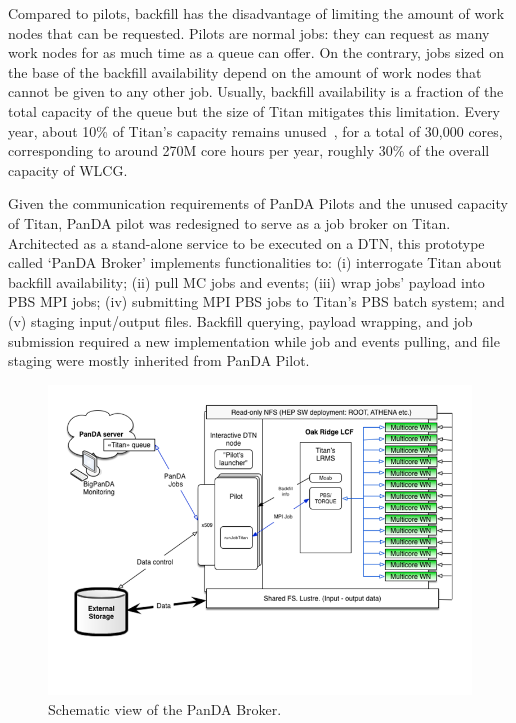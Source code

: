 Compared to pilots, backfill has the disadvantage of limiting the amount of work
nodes that can be requested. Pilots are normal jobs: they can request as many
work nodes for as much time as a queue can offer. On the contrary, jobs sized on
the base of the backfill availability depend on the amount of work nodes that
cannot be given to any other job. Usually, backfill availability is a fraction
of the total capacity of the queue but the size of Titan mitigates this
limitation. Every year, about 10\% of Titan's capacity remains
unused~\cite{titan_utilization}, for a total of 30,000 cores, corresponding to
around 270M core hours per year, roughly 30\% of the overall capacity of WLCG.



Given the communication requirements of PanDA Pilots and the unused capacity of
Titan, PanDA pilot was redesigned to serve as a job broker on Titan. Architected
as a stand-alone service to be executed on a DTN, this prototype called `PanDA
Broker' implements functionalities to: (i) interrogate Titan about backfill
availability; (ii) pull MC jobs and events; (iii) wrap jobs' payload into PBS
MPI jobs; (iv) submitting MPI PBS jobs to Titan's PBS batch system; and (v)
staging input/output files. Backfill querying, payload wrapping, and job
submission required a new implementation while job and events pulling, and file
staging were mostly inherited from PanDA Pilot.

\begin{figure}
  \begin{center}
    \includegraphics[width=\columnwidth]{figures/PanDA_setup_at_OLCF.png}
    \caption{Schematic view of the PanDA Broker.}
  \end{center}
\label{fig:panda_broker}
\end{figure}

